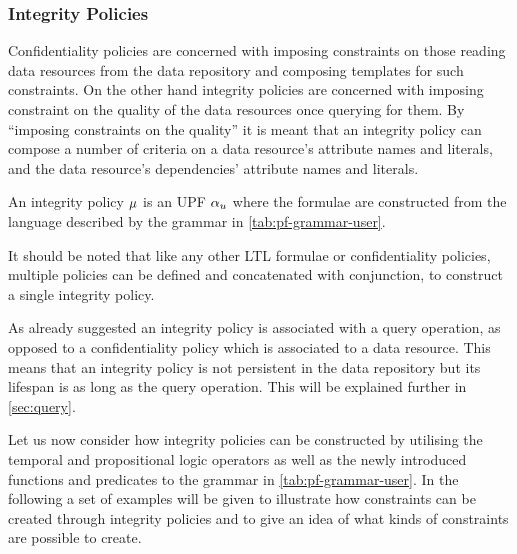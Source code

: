 \subsubsection{Integrity Policies}
Confidentiality policies are concerned with imposing constraints on those reading data resources from the data repository and composing templates for such constraints. On the other hand integrity policies are concerned with imposing constraint on the quality of the data resources once querying for them. By ``imposing constraints on the quality'' it is meant that an integrity policy can compose a number of criteria on a data resource's attribute names and literals, and the data resource's dependencies' attribute names and literals.
\begin{definition}\label{def:ip}
An integrity policy $\mu$ is an UPF $\alpha_u$ where the formulae are constructed from the language described by the grammar in \autoref{tab:pf-grammar-user}.
\end{definition}
It should be noted that like any other LTL formulae or confidentiality policies, multiple policies can be defined and concatenated with conjunction, to construct a single integrity policy.

As already suggested an integrity policy is associated with a query operation, as opposed to a confidentiality policy which is associated to a data resource. This means that an integrity policy is not persistent in the data repository but its lifespan is as long as the query operation. This will be explained further in \autoref{sec:query}.

Let us now consider how integrity policies can be constructed by utilising the temporal and propositional logic operators as well as the newly introduced functions and predicates to the grammar in \autoref{tab:pf-grammar-user}. In the following a set of examples will be given to illustrate how constraints can be created through integrity policies and to give an idea of what kinds of constraints are possible to create.

